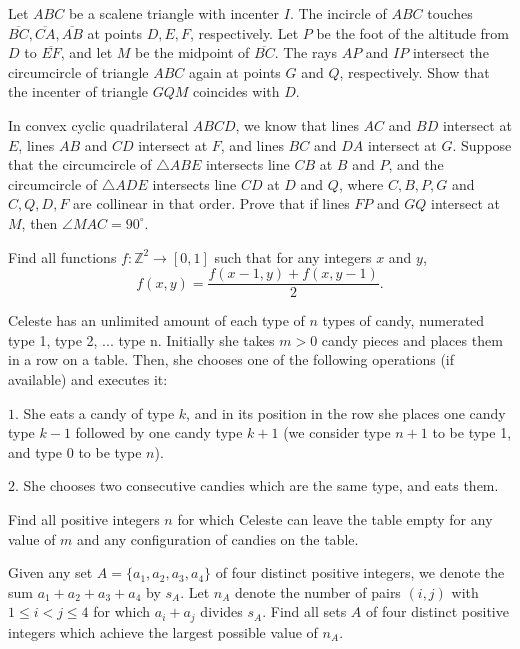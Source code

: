 \documentclass[11pt]{scrartcl}
\begin{document}
\begin{problem}[6322745101407512634]
Let $ABC$ be a scalene triangle with incenter $I$. The incircle of $ABC$ touches $\overline{BC},\overline{CA},\overline{AB}$ at points $D,E,F$, respectively. Let $P$ be the foot of the altitude from $D$ to $\overline{EF}$, and let $M$ be the midpoint of $\overline{BC}$. The rays $AP$ and $IP$ intersect the circumcircle of triangle $ABC$ again at points $G$ and $Q$, respectively. Show that the incenter of triangle $GQM$ coincides with $D$.
\end{problem}
\begin{problem}[6340105142765788083]
In convex cyclic quadrilateral $ABCD$, we know that lines $AC$ and $BD$ intersect at $E$, lines $AB$ and $CD$ intersect at $F$, and lines $BC$ and $DA$ intersect at $G$. Suppose that the circumcircle of $\triangle ABE$ intersects line $CB$ at $B$ and $P$, and the circumcircle of $\triangle ADE$ intersects line $CD$ at $D$ and $Q$, where $C,B,P,G$ and $C,Q,D,F$ are collinear in that order. Prove that if lines $FP$ and $GQ$ intersect at $M$, then $\angle MAC = 90^\circ$.
\end{problem}
\begin{problem}[6360153743145135128]
Find all functions $f\colon \mathbb{Z}^2 \to [0, 1]$ such that for any integers $x$ and $y$,
\[f(x, y) = \frac{f(x - 1, y) + f(x, y - 1)}{2}.\]
\end{problem}
\begin{problem}[6377764165704184464]
	Celeste has an unlimited amount of each type of $n$ types of candy, numerated type 1, type 2, ... type n. Initially she takes $m>0$ candy pieces and places them in a row on a table. Then, she chooses one of the following operations (if available) and executes it:

$1.$ She eats a candy of type $k$, and in its position in the row she places one candy type $k-1$ followed by one candy type $k+1$ (we consider type $n+1$ to be type 1, and type 0 to be type $n$).

$2.$ She chooses two consecutive candies which are the same type, and eats them.

Find all positive integers $n$ for which Celeste can leave the table empty for any value of $m$ and any configuration of candies on the table.
\end{problem}
\begin{problem}[6405240413257919216]
	Given any set $A = \{a_1, a_2, a_3, a_4\}$ of four distinct positive integers, we denote the sum $a_1 +a_2 +a_3 +a_4$ by $s_A$. Let $n_A$ denote the number of pairs $(i, j)$ with $1 \leq  i < j \leq 4$ for which $a_i +a_j$ divides $s_A$. Find all sets $A$ of four distinct positive integers which achieve the largest possible value of $n_A$.
\end{problem}
\end{document}
